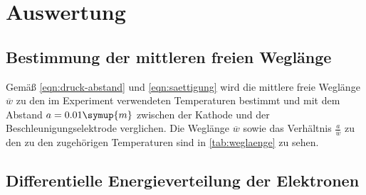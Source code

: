 \section{Auswertung}
\label{sec:Auswertung}
    \subsection{Bestimmung der mittleren freien Weglänge}
    Gemäß \eqref{eqn:druck-abstand} und \eqref{eqn:saettigung} wird die mittlere freie Weglänge $\overline{w}$ zu den im Experiment verwendeten Temperaturen bestimmt und mit dem Abstand $a = 0.01 \symup{m}$
    zwischen der Kathode und der Beschleunigungselektrode verglichen. Die Weglänge $\overline{w}$ sowie das Verhältnis $\frac{a}{\overline{w}}$
    zu den zu den zugehörigen Temperaturen sind in \autoref{tab:weglaenge} zu sehen. 
    


    \subsection{Differentielle Energieverteilung der Elektronen}
